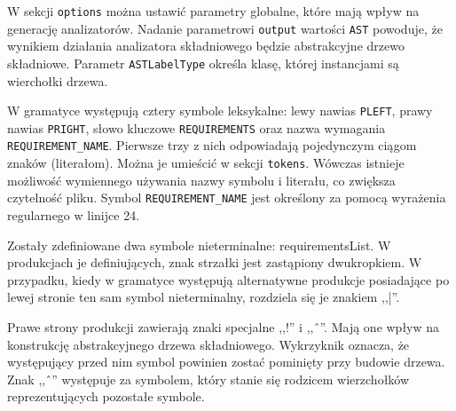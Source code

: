 W sekcji \texttt{options} można ustawić parametry globalne, które mają
wpływ na generację analizatorów. Nadanie parametrowi \texttt{output}
wartości \texttt{AST} powoduje, że wynikiem działania analizatora
składniowego będzie abstrakcyjne drzewo składniowe. Parametr 
\texttt{ASTLabelType} określa klasę, której instancjami są wierchołki drzewa.

W gramatyce występują cztery symbole leksykalne: lewy nawias \texttt{PLEFT}, 
prawy nawias \texttt{PRIGHT}, słowo kluczowe \texttt{REQUIREMENTS} oraz
nazwa wymagania \texttt{REQUIREMENT\_NAME}. Pierwsze trzy z nich 
odpowiadają pojedynczym ciągom znaków (literałom). Można je umieścić
w sekcji \texttt{tokens}. Wówczas istnieje możliwość wymiennego używania 
nazwy symbolu i literału, co zwiększa czytelność pliku. Symbol
\texttt{REQUIREMENT\_NAME} jest określony za pomocą wyrażenia regularnego
w linijce 24.

Zostały zdefiniowane dwa symbole nieterminalne: requirementsList. W produkcjach
je definiujących, znak strzałki jest zastąpiony dwukropkiem. W przypadku,
kiedy w gramatyce występują alternatywne produkcje posiadające po lewej
stronie ten sam symbol nieterminalny, rozdziela się je znakiem ,,|''.

Prawe strony produkcji zawierają znaki specjalne ,,!'' i ,,\^\ ''. Mają one
wpływ na konstrukcję abstrakcyjnego drzewa składniowego. Wykrzyknik 
oznacza, że występujący przed nim symbol powinien zostać pominięty przy
budowie drzewa. Znak ,,\^\ '' występuje za symbolem, który stanie się rodzicem
wierzchołków reprezentujących pozostałe symbole.



